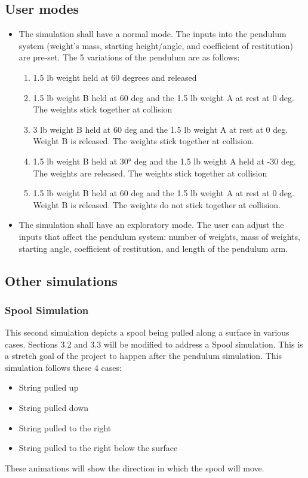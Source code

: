 \documentclass[onecolumn, draftclsnofoot,10pt, compsoc]{IEEEtran}
\begin{document}
\subsection{User modes}
\begin{itemize}
\item The simulation shall have a normal mode. The inputs into the pendulum system (weight's mass, starting height/angle, and coefficient of restitution) are pre-set.
The 5 variations of the pendulum are as follows:
\begin{enumerate}
    \item 1.5 lb weight held at 60 degrees and released
    \item 1.5 lb weight B held at 60 deg and the 1.5 lb
weight A at rest at 0 deg. The weights stick together at collision
    \item 3 lb weight B held at 60 deg and the 1.5 lb weight A at rest at 0 deg. Weight B is released. The weights stick together at collision.
    \item 1.5 lb weight B held at 30° deg and the 1.5 lb weight A held at -30 deg. The weights are released. The weights stick together at collision
    \item 1.5 lb weight B held at 60 deg and the 1.5 lb weight A at rest at 0 deg. Weight B is released. The weights do not stick together at collision.
\end{enumerate}
\item The simulation shall have an exploratory mode. The user can adjust the inputs that affect the pendulum system:
number of weights, mass of weights, starting angle, coefficient of restitution, and length of the pendulum arm. 
\end{itemize}

\subsection{Other simulations}
\subsubsection{Spool Simulation}
This second simulation depicts a spool being pulled along a surface in various cases. Sections 3.2 and 3.3 will be modified to address a Spool simulation. This is a stretch goal of the project to happen after the pendulum simulation. This simulation follows these 4 cases:
\begin{itemize}
    \item String pulled up
    \item String pulled down
    \item String pulled to the right
    \item String pulled to the right below the surface
\end{itemize}
These animations will show the direction in which the spool will move. 
\end{document}
